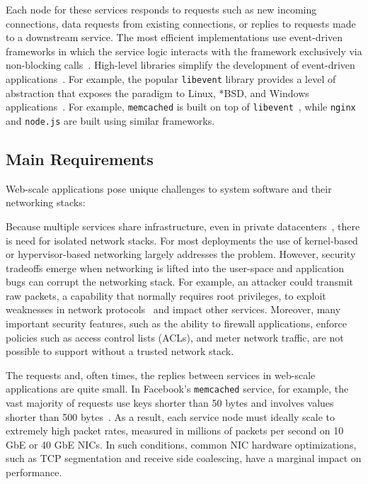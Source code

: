 Each node for these services responds to requests such as new incoming
connections, data requests from existing connections, or replies to
requests made to a downstream service.  The most efficient
implementations use event-driven frameworks in which the service logic
interacts with the framework exclusively via non-blocking
calls~\cite{DBLP:conf/usenix/PaiDZ99,DBLP:conf/sosp/WelshCB01}.
High-level libraries simplify the development of event-driven
applications~\cite{libev,libuv,provos2003libevent}.  For example, the
popular \texttt{libevent} library provides a level of abstraction that
exposes the paradigm to Linux, *BSD, and Windows
applications~\cite{provos2003libevent}. For example,
\texttt{memcached} is built on top of
\texttt{libevent}~\cite{url:memcached}, while \texttt{nginx} and
\texttt{node.js} are built using similar frameworks.


\subsection{Main Requirements}
\label{sec:motivation:challenges}


Web-scale applications pose unique challenges to system
software and their networking stacks:

 Because multiple
services share infrastructure, even in private
datacenters~\cite{DBLP:journals/cacm/DeanB13,Hindman:2011:MPF,Schwarzkopf:2013:OFS},
there is need for isolated network stacks. For most deployments
the use of kernel-based or hypervisor-based networking largely
addresses the problem.  However, security tradeoffs emerge when
networking is lifted into the user-space and application bugs can
corrupt the networking stack. For example, an attacker could transmit
raw packets, a capability that normally requires root privileges,
to exploit weaknesses in network protocols~\cite{DBLP:conf/acsac/Bellovin04}
 and impact other services.
Moreover, many important security features, such as the ability to firewall
applications, enforce policies such as access control lists
(ACLs), and meter network traffic, are not possible to support
without a trusted network stack.


 The requests and, often times, the
replies between services in web-scale applications are quite small. In
Facebook's \texttt{memcached} service, for example, the vast majority
of requests use keys shorter than 50 bytes and involves values shorter
than 500 bytes~\cite{Atikoglu:2012:WAL}. As a result, each service
node must ideally scale to extremely high packet rates, measured in
millions of packets per second on 10 GbE or 40 GbE NICs.  In such
conditions, common NIC hardware optimizations, such as TCP
segmentation and receive side coalescing, have a marginal impact on
performance.


